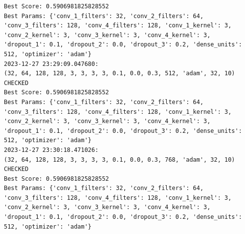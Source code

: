 \begin{verbatim}
Best Score: 0.5906981825828552
Best Params: {'conv_1_filters': 32, 'conv_2_filters': 64, 'conv_3_filters': 128, 'conv_4_filters': 128, 'conv_1_kernel': 3, 'conv_2_kernel': 3, 'conv_3_kernel': 3, 'conv_4_kernel': 3, 'dropout_1': 0.1, 'dropout_2': 0.0, 'dropout_3': 0.2, 'dense_units': 512, 'optimizer': 'adam'}
2023-12-27 23:29:09.047680:
(32, 64, 128, 128, 3, 3, 3, 3, 0.1, 0.0, 0.3, 512, 'adam', 32, 10) CHECKED
Best Score: 0.5906981825828552
Best Params: {'conv_1_filters': 32, 'conv_2_filters': 64, 'conv_3_filters': 128, 'conv_4_filters': 128, 'conv_1_kernel': 3, 'conv_2_kernel': 3, 'conv_3_kernel': 3, 'conv_4_kernel': 3, 'dropout_1': 0.1, 'dropout_2': 0.0, 'dropout_3': 0.2, 'dense_units': 512, 'optimizer': 'adam'}
2023-12-27 23:30:18.471026:
(32, 64, 128, 128, 3, 3, 3, 3, 0.1, 0.0, 0.3, 768, 'adam', 32, 10) CHECKED
Best Score: 0.5906981825828552
Best Params: {'conv_1_filters': 32, 'conv_2_filters': 64, 'conv_3_filters': 128, 'conv_4_filters': 128, 'conv_1_kernel': 3, 'conv_2_kernel': 3, 'conv_3_kernel': 3, 'conv_4_kernel': 3, 'dropout_1': 0.1, 'dropout_2': 0.0, 'dropout_3': 0.2, 'dense_units': 512, 'optimizer': 'adam'}
\end{verbatim}

\newpage

\section{}
\label{app:appendix-b}


